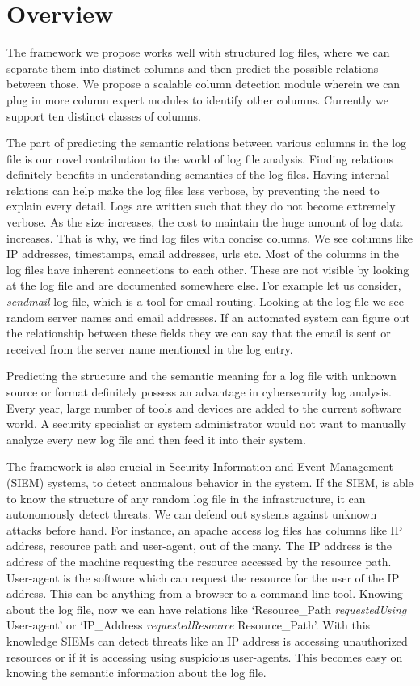 \chapter{Overview}
\thispagestyle{plain}
\label{Overview}

The framework we propose works well with structured log files, where we can separate them into distinct columns and then predict the possible relations between those. We propose a scalable column detection module wherein we can plug in more column expert modules to identify other columns. Currently we support ten distinct classes of columns.

The part of predicting the semantic relations between various columns in the log file is our novel contribution to the world of log file analysis. Finding relations definitely benefits in understanding semantics of the log files. Having internal relations can help make the log files less verbose, by preventing the need to explain every detail. Logs are written such that they do not become extremely verbose. As the size increases, the cost to maintain the huge amount of log data increases. That is why, we find log files with concise columns. We see columns like IP addresses, timestamps, email addresses, urls etc. Most of the columns in the log files have inherent connections to each other. These are not visible by looking at the log file and are documented somewhere else. For example let us consider, \textit{sendmail} log file, which is a tool for email routing. Looking at the log file we see random server names and email addresses. If an automated system can figure out the relationship between these fields they we can say that the email is sent or received from the server name mentioned in the log entry.

Predicting the structure and the semantic meaning for a log file with unknown source or format definitely possess an advantage in cybersecurity log analysis. Every year, large number of tools and devices are added to the current software world. A security specialist or system administrator would not want to manually analyze every new log file and then feed it into their system. 

The framework is also crucial in Security Information and Event Management (SIEM) systems, to detect anomalous behavior in the system. If the SIEM, is able to know the structure of any random log file in the infrastructure, it can autonomously detect threats. We can defend out systems against unknown attacks before hand. For instance, an apache access log files has columns like IP address, resource path and user-agent, out of the many. The IP address is the address of the machine requesting the resource accessed by the resource path. User-agent is the software which can request the resource for the user of the IP address. This can be anything from a browser to a command line tool. Knowing about the log file, now we can have relations like `Resource\_Path \textit{requestedUsing} User-agent' or `IP\_Address \textit{requestedResource} Resource\_Path'. With this knowledge SIEMs can detect threats like an IP address is accessing unauthorized resources or if it is accessing using suspicious user-agents. This becomes easy on knowing the semantic information about the log file.


